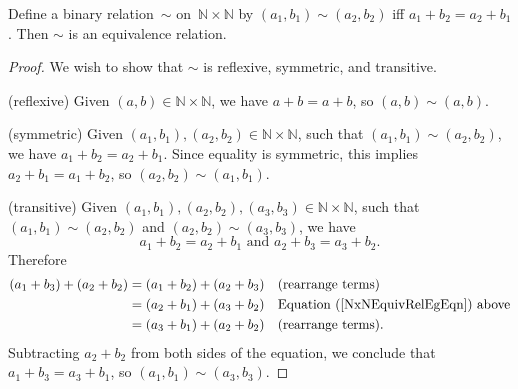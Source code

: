 \begin{eg} \label{NxNEquivRelEg}
Define a binary relation~$\sim$ on~$\mathbb{N} \times \mathbb{N}$ by $(a_1,b_1) \sim (a_2,b_2)$ iff $a_1 + b_2 = a_2 + b_1$. Then $\sim$ is an equivalence relation.

\begin{proof}
We wish to show that $\sim$ is reflexive, symmetric, and transitive.

\noindent
(reflexive) Given $(a,b) \in \mathbb{N} \times \mathbb{N}$, we have $a + b = a + b$, so $(a,b) \sim (a,b)$.

\noindent
(symmetric) Given $(a_1,b_1) , (a_2,b_2) \in \mathbb{N} \times \mathbb{N}$, such that $(a_1,b_1) \sim (a_2,b_2)$, we have $a_1 +b_2 = a_2 + b_1$. Since equality is symmetric, this implies $a_2 + b_1 = a_1 + b_2$, so $(a_2,b_2) \sim (a_1,b_1)$.

\noindent
(transitive) Given $(a_1,b_1) , (a_2,b_2) , (a_3,b_3) \in \mathbb{N} \times \mathbb{N}$, such that $(a_1,b_1) \sim (a_2,b_2)$ and $(a_2,b_2) \sim (a_3,b_3)$, we have 
\begin{equation} \label{NxNEquivRelEgEqn}
	\text{$a_1 + b_2 = a_2 + b_1$ and $a_2 + b_3 = a_3 + b_2$.}
\end{equation}
Therefore 
	\begin{align*}
	(a_1 + b_3) + (a_2 + b_2)
		&= (a_1 + b_2) + (a_2 + b_3) && \text{(rearrange terms)}
		\\&= (a_2 + b_1) + (a_3 + b_2) && \text{Equation (\ref{NxNEquivRelEgEqn}) above}
		\\&= (a_3 + b_1) + (a_2 + b_2) && \text{(rearrange terms)} .
	\end{align*}
Subtracting $a_2 + b_2$ from both sides of the equation, we conclude that $a_1 + b_3 = a_3 + b_1$,
so $(a_1,b_1) \sim (a_3,b_3)$.
\end{proof}
\end{eg}


